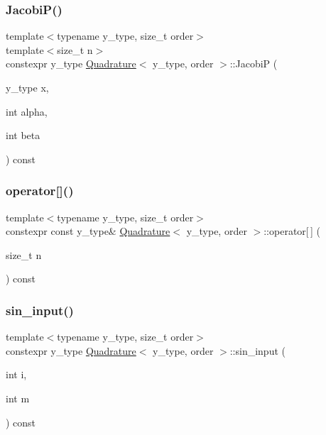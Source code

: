 \subsubsection{\texorpdfstring{Jacobi\+P()}{JacobiP()}}
{\footnotesize\ttfamily template$<$typename y\+\_\+type, size\+\_\+t order$>$ \\
template$<$size\+\_\+t n$>$ \\
constexpr y\+\_\+type \hyperlink{class_quadrature}{Quadrature}$<$ y\+\_\+type, order $>$\+::JacobiP (\begin{DoxyParamCaption}\item[{y\+\_\+type}]{x,  }\item[{int}]{alpha,  }\item[{int}]{beta }\end{DoxyParamCaption}) const\hspace{0.3cm}{\ttfamily [inline]}}

\mbox{\label{class_quadrature_a99f64a4cef3011cbf0df06a4e8eec0c0}} 
\subsubsection{\texorpdfstring{operator[]()}{operator[]()}}
{\footnotesize\ttfamily template$<$typename y\+\_\+type, size\+\_\+t order$>$ \\
constexpr const y\+\_\+type\& \hyperlink{class_quadrature}{Quadrature}$<$ y\+\_\+type, order $>$\+::operator\mbox{[}$\,$\mbox{]} (\begin{DoxyParamCaption}\item[{size\+\_\+t}]{n }\end{DoxyParamCaption}) const\hspace{0.3cm}{\ttfamily [inline]}}

\mbox{\label{class_quadrature_a58f654e4f2cc08855dfed52d65b35c04}} 
\subsubsection{\texorpdfstring{sin\+\_\+input()}{sin\_input()}}
{\footnotesize\ttfamily template$<$typename y\+\_\+type, size\+\_\+t order$>$ \\
constexpr y\+\_\+type \hyperlink{class_quadrature}{Quadrature}$<$ y\+\_\+type, order $>$\+::sin\+\_\+input (\begin{DoxyParamCaption}\item[{int}]{i,  }\item[{int}]{m }\end{DoxyParamCaption}) const\hspace{0.3cm}{\ttfamily [inline]}}

